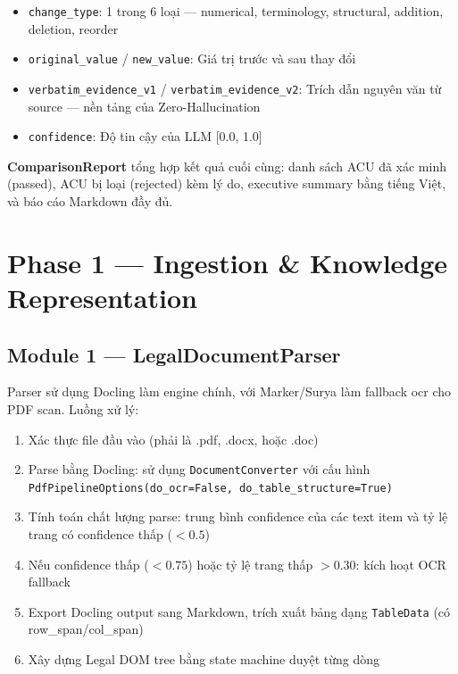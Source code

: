 \begin{itemize}
    \item \texttt{change\_type}: 1 trong 6 loại — numerical, terminology, structural, addition, deletion, reorder
    \item \texttt{original\_value} / \texttt{new\_value}: Giá trị trước và sau thay đổi
    \item \texttt{verbatim\_evidence\_v1} / \texttt{verbatim\_evidence\_v2}: Trích dẫn nguyên văn từ source — nền tảng của Zero-Hallucination
    \item \texttt{confidence}: Độ tin cậy của LLM [0.0, 1.0]
\end{itemize}

\textbf{ComparisonReport} tổng hợp kết quả cuối cùng: danh sách ACU đã xác minh (passed), ACU bị loại (rejected) kèm lý do, executive summary bằng tiếng Việt, và báo cáo Markdown đầy đủ.

\section{Phase 1 — Ingestion \& Knowledge Representation}

\subsection{Module 1 — LegalDocumentParser}

Parser sử dụng Docling \cite{docling2024} làm engine chính, với Marker/Surya \cite{marker2024,surya2024} làm fallback \gls{ocr} cho PDF scan. Luồng xử lý:

\begin{enumerate}[label=(\arabic*)]
    \item Xác thực file đầu vào (phải là .pdf, .docx, hoặc .doc)
    \item Parse bằng Docling: sử dụng \texttt{DocumentConverter} với cấu hình \texttt{PdfPipelineOptions(do\_ocr=False, do\_table\_structure=True)}
    \item Tính toán chất lượng parse: trung bình confidence của các text item và tỷ lệ trang có confidence thấp ($< 0.5$)
    \item Nếu confidence thấp ($< 0.75$) hoặc tỷ lệ trang thấp $> 0.30$: kích hoạt OCR fallback
    \item Export Docling output sang Markdown, trích xuất bảng dạng \texttt{TableData} (có row\_span/col\_span)
    \item Xây dựng Legal DOM tree bằng state machine duyệt từng dòng
\end{enumerate}

